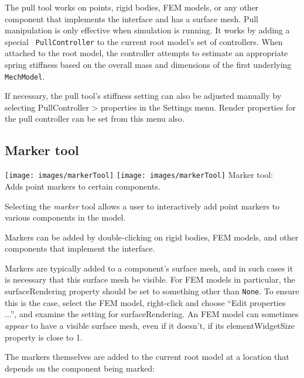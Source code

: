 \documentclass{article}
\begin{document}
The pull tool works on points, rigid bodies, FEM models, or any other
component that implements the
 interface and
has a surface mesh. Pull manipulation is only effective when
simulation is running.  It works by adding a special {\tt
PullController} to the current root model's set of controllers. When
attached to the root model, the controller attempts to estimate an
appropriate spring stiffness based on the overall mass and dimensions
of the first underlying {\tt MechModel}.

If necessary, the pull tool's stiffness setting can also be adjusted
manually by selecting {\sf PullController > properties} in the {\sf
Settings} menu.  Render properties for the pull controller can be set
from this menu also.

\subsection{Marker tool}
\label{MarkerTool}

\vspace{\parskip}
\iflatexml
\phantom{.}\texttt{[image: images/markerTool]}
\else
\texttt{[image: images/markerTool]}
\fi
{\sf Marker tool:}\\
Adds point markers to certain components.

Selecting the {\it marker} tool allows a user to interactively add
point markers to various components in the model.

Markers can be added by double-clicking on rigid bodies, FEM models,
and other components that implement the
 interface.

\begin{sideblock}
Markers are typically added to a component's surface mesh, and in such
cases it is necessary that this surface mesh be visible. For FEM
models in particular, the {\sf surfaceRendering} property should be
set to something other than {\tt None}. To ensure this is the case,
select the FEM model, right-click and choose {\sf ``Edit properties
...''}, and examine the setting for {\sf surfaceRendering}. An FEM model
can sometimes {\it appear} to have a visible surface mesh, even if it
doesn't, if its {\sf elementWidgetSize} property is close to 1.
\end{sideblock}

The markers themselves are added to the current root model at a
location that depends on the component being marked:
\end{document}
